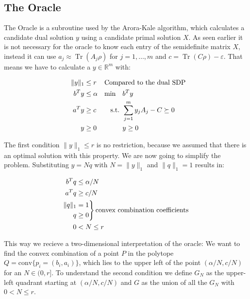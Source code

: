 \documentclass[11pt,a4paper]{scrartcl}
\DeclareMathOperator{\Tr}{Tr}
\begin{document}
\subsection{The Oracle}

The Oracle is a subroutine used by the Arora-Kale algorithm, which calculates a candidate dual solution $y$ using a candidate primal solution $X$. As seen earlier it is not necessary for the oracle to know each entry of the semidefinite matrix $X$, instead it can use $a_j\approx\Tr(A_j\rho)$ for $j=1,\ldots,m$ and $c=\Tr(C\rho)-\varepsilon$. That means we have to calculate a $y\in \mathbb{R}^m$ with:

\begin{align*}
\|y\|_1&\leq r & \omit\rlap{Compared to the dual SDP}\\
b^T y&\leq \alpha&\min \quad &b^T y\\
a^T y&\geq c& \text{s.t. } &\sum_{j=1}^m y_j A_j - C\succeq 0\\
y&\geq 0 & &y\geq 0
\end{align*}

The first condition $\|y\|_1\leq r$ is no restriction, because we assumed that there is an optimal solution with this property. We are now going to simplify the problem. Substituting $y=Nq$ with $N=\|y\|_1$ and $\|q\|_1=1$ results in:

\begin{equation*}
 \begin{split}
  b^T q&\leq \alpha/N\\
  a^T q&\geq c/N\\
  \begin{aligned}
   \|q\|_1\\
   q
  \end{aligned}
  &
  \begin{rcases*}
   =1\\
   \geq 0
  \end{rcases*} \text{convex combination coefficients}  \\
  0&<N\leq r
 \end{split}
\end{equation*}

This way we recieve a two-dimensional interpretation of the oracle: We want to find the convex combination of a point $P$ in the polytope $Q=\mathrm{conv}\{p_i=(b_i,a_i)\}$, which lies to the upper left of the point $(\alpha/N, c/N)$ for an $N\in (0,r]$. To understand the second condition we define $G_N$ as the upper-left quadrant starting at $(\alpha/N, c/N)$ and $G$ as the union of all the $G_N$ with $0<N\leq r$.
\end{document}
